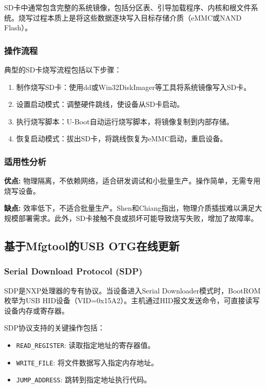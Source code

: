 \documentclass[a4paper,12pt]{article}
\begin{document}
SD卡中通常包含完整的系统镜像，包括分区表、引导加载程序、内核和根文件系统。烧写过程本质上是将这些数据逐块写入目标存储介质（eMMC或NAND Flash）。

\subsubsection{操作流程}
典型的SD卡烧写流程包括以下步骤：
\begin{enumerate}
    \item 制作烧写SD卡：使用dd或Win32DiskImager等工具将系统镜像写入SD卡。
    \item 设置启动模式：调整硬件跳线，使设备从SD卡启动。
    \item 执行烧写脚本：U-Boot自动运行烧写脚本，将镜像复制到内部存储。
    \item 恢复启动模式：拔出SD卡，将跳线恢复为eMMC启动，重启设备。
\end{enumerate}

\subsubsection{适用性分析}
\textbf{优点:} 物理隔离，不依赖网络，适合研发调试和小批量生产。操作简单，无需专用烧写设备。

\textbf{缺点:} 效率低下，不适合批量生产。Shen和Chiang指出，物理介质插拔难以满足大规模部署需求\cite{Shen2007}。此外，SD卡接触不良或损坏可能导致烧写失败，增加了故障率。

\subsection{基于Mfgtool的USB OTG在线更新}

\subsubsection{Serial Download Protocol (SDP)}
SDP是NXP处理器的专有协议。当设备进入Serial Downloader模式时，BootROM枚举为USB HID设备（VID=0x15A2）。主机通过HID报文发送命令，可直接读写设备内存或寄存器。

SDP协议支持的关键操作包括：
\begin{itemize}
    \item \texttt{READ\_REGISTER}: 读取指定地址的寄存器值。
    \item \texttt{WRITE\_FILE}: 将文件数据写入指定内存地址。
    \item \texttt{JUMP\_ADDRESS}: 跳转到指定地址执行代码。
\end{itemize}
\end{document}
